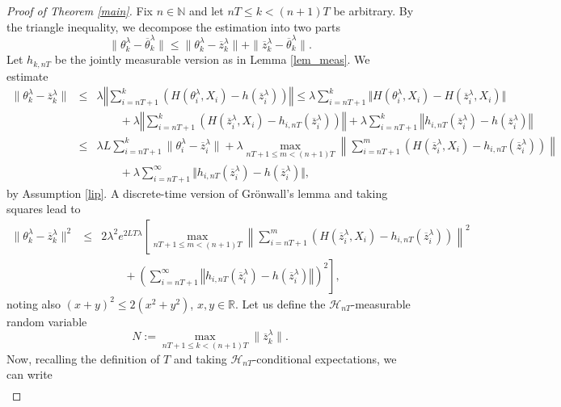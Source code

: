 \documentclass[a4paper]{article}
\begin{document}
\begin{proof}[ Proof of Theorem \ref{main}] Fix 
$n\in\mathbb{N}$ and let $nT\leq k<(n+1)T$ be arbitrary. By the triangle inequality, we decompose the estimation into two parts
$$	\|\theta^{\lambda}_k-\overline{\theta}^{\lambda}_k\|\leq \|{\theta}^{\lambda}_k-\overline{z}_k^{\lambda}\|+
	\|\overline{z}_k^{\lambda}-\overline{\theta}^{\lambda}_k\|.$$
Let $h_{k,nT}$ be the jointly measurable version as in Lemma \ref{lem_meas}. We estimate
\begin{eqnarray*}
\| \theta_{k}^{\lambda}-\overline{z}^{\lambda}_{k}\| &\leq& \lambda \left\Vert\sum_{i=nT+1}^k 	\left(H(\theta^{\lambda}_i,X_i)-h(\overline{z}^{\lambda}_i)\right)\right\Vert \leq
		\lambda \sum_{i=nT+1}^k \Vert
		H(\theta^{\lambda}_i,X_i)-H(\overline{z}^{\lambda}_i,X_i)\Vert \\
		&& \qquad+
		\lambda \left\Vert\sum_{i=nT+1}^{k}
		\left(H(\overline{z}^{\lambda}_i,X_i)-h_{i,nT}(\overline{z}^{\lambda}_i)\right) \right\Vert +
		\lambda \sum_{i=nT+1}^k
		\left\Vert h_{i,nT}(\overline{z}^{\lambda}_i)- h(\overline{z}^{\lambda}_i)\right\Vert \\
&\leq&	\lambda L \sum_{i=nT+1}^k \|\theta^{\lambda}_i-\overline{z}^{\lambda}_i\| + 		\lambda
		\max_{nT+1\leq m< (n+1)T} \left\|\sum_{i=nT+1}^m \left(H(\overline{z}_i^{\lambda},X_i)-
		h_{i,nT}(\overline{z}^{\lambda}_i)\right)\right\|\\
		&& \qquad + 		\lambda \sum_{i=nT+1}^{\infty} \Vert h_{i,nT}(\overline{z}_i^{\lambda})- h(\overline{z}_i^{\lambda})\Vert,
	\end{eqnarray*}
	by Assumption \ref{lip}.
A discrete-time version of Gr\"onwall's lemma and taking squares lead to
	\begin{eqnarray*}
		\|\theta^{\lambda}_{k}-\overline{z}_{k}^{\lambda}\|^2 &\leq&
		2\lambda^2 e^{2LT\lambda}
		\left[\max_{nT+1\leq m< (n+1)T} \left\|\sum_{i=nT+1}^m \left(H(\overline{z}_i^{\lambda},X_i)-
		h_{i,nT}(\overline{z}^{\lambda}_i)\right)\right\|^2 \right.\\
		&& \qquad +
		\left. \left(\sum_{i=nT+1}^{\infty} \left\Vert h_{i,nT}(\overline{z}_i^{\lambda})- h(\overline{z}_i^{\lambda})\right\Vert\right)^2\right],
	\end{eqnarray*}
	noting also $(x+y)^2\leq 2(x^2+y^2)$, $x,y\in\mathbb{R}$.
	Let us define the $\mathcal{H}_{nT}$-measurable random variable
	$$
	N:=\max_{nT+1\leq k< (n+1)T}\|\overline{z}_k^{\lambda}\|.
	$$
	Now, recalling the definition of $T$ and taking $\mathcal{H}_{nT}$-conditional expectations, we can write
\begin{eqnarray*}

\end{eqnarray*}
\end{proof}
\end{document}
